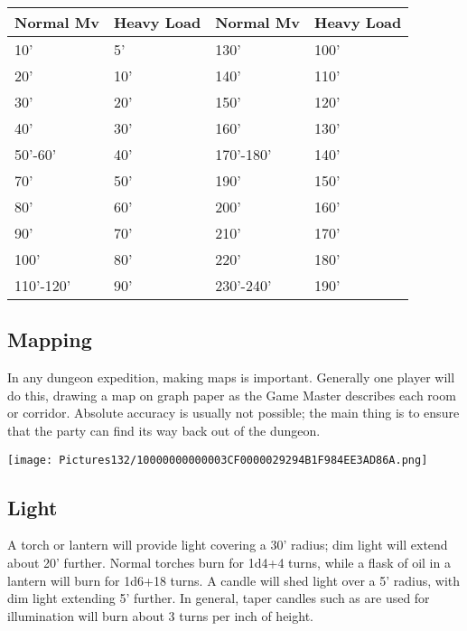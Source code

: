 \documentclass[a4paper,twoside,openany,10pt]{book}
\begin{document}
\begin{multicols}{2}
\begin{flushleft}
	\begin{tabularx}{0.47\textwidth}{@{}ll|ll@{}}
\textbf{Normal Mv}&\textbf{Heavy Load}&\textbf{Normal Mv}&\textbf{Heavy Load}\\\toprule
10' & 5' &  130' &100' \\\hline
20' & 10' &  140' &110' \\\hline
30' & 20' &  150' &120' \\\hline
40' & 30' &  160' &130' \\\hline
50'-60' & 40' &170'-180' & 140' \\\hline
70' & 50' &  190' &150' \\\hline
80' & 60' &  200' &160' \\\hline
90' & 70' &  210' &170' \\\hline
100' & 80' &  220' &180' \\\hline
110'-120' & 90'  &230'-240' & 190' \\\bottomrule
\end{tabularx}
\end{flushleft}

\subsection{Mapping}\label{mapping}

In any dungeon expedition, making maps is important. Generally one player will do this, drawing a map on graph paper as the Game Master describes each room or corridor. Absolute accuracy is usually not possible; the main thing is to ensure that the party can find its way back out of the dungeon.

\begin{flushleft}
	\texttt{[image: Pictures132/10000000000003CF0000029294B1F984EE3AD86A.png]}
\end{flushleft}

\subsection{Light}\label{light}

A torch or lantern will provide light covering a 30' radius; dim light will extend about 20' further. Normal torches burn for 1d4+4 turns, while a flask of oil in a lantern will burn for 1d6+18 turns. A candle will shed light over a 5' radius, with dim light extending 5' further. In general, taper candles such as are used for illumination will burn about 3 turns per inch of height.


\end{multicols}
\end{document}
